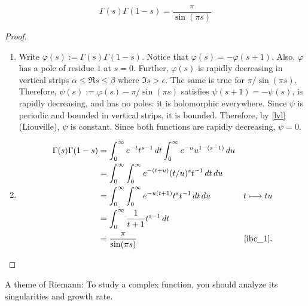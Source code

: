 \documentclass[11pt, oneside,margin=1in]{article}
\begin{document}
\begin{proposition}\label{}\text{}
\[
	\Gamma(s)\Gamma (1-s) = \frac{\pi}{\sin  (\pi s)}
\]
\end{proposition}
\begin{proof}
\text{}
\begin{enumerate}
	\item Write $\varphi(s) := \Gamma (s)\Gamma (1-s)$. Notice that $\varphi(s) = - \varphi (s+1)$. Also, $\varphi$ has a pole of residue $1$ at $s=0$. Further, $\varphi(s)$ is rapidly decreasing in vertical strips $\alpha\le\Re s\le \beta$ where $\Im s>\epsilon$. The same is true for $\pi/\sin(\pi s)$. Therefore, $\psi(s) :=  \varphi(s) - \pi/\sin (\pi s)$ satisfies $\psi(s+1)=-\psi (s)$, is rapidly decreasing, and has no poles: it is holomorphic everywhere. Since $\psi$ is periodic and bounded in vertical strips, it is bounded. Therefore, by \cref{lvl} (Liouville), $\psi$ is constant. Since both functions are rapidly decreasing, $\psi = 0$.
	\item \begin{align*}
			\Gamma(s)\Gamma (1-s) &=  \int_0^\infty e^{-t}t^{s-1} \, dt \int_0^\infty e^{-u} u^{1-(s-1)}\, du\\
					      &= \int_0^\infty\int_0^\infty e^{- (t+u) } (t/u)^s t\inv \, dt\, du\\
					      &= \int_0^\infty \int_0^\infty e^{-u (t+1)} t^s t\inv \,dt\,du&t\longmapsto tu\\
					      &= \int_0^\infty \frac{1}{t+1} t^{s-1} \,dt\\
					      &= \frac{\pi}{\sin  (\pi s)} & \textrm{\cref{ibc_1}.} 
	\end{align*}
\end{enumerate}
\end{proof}

\begin{remark}
	A theme of Riemann: To study a complex function, you should analyze its singularities and growth rate.
\end{remark}
\end{document}
